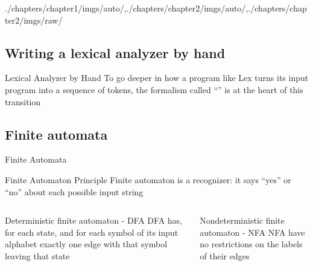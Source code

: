 \begin{graphicspathcontext}{{./chapters/chapter1/imgs/auto/},{./chapters/chapter2/imgs/auto/},{./chapters/chapter2/imgs/raw/}}
\begin{bibunit}[apalike]
\section[Lexical analyzer by hand]{Writing a lexical analyzer by hand}
\sectiontableofcontentslide

\begin{frame}[background=6]{Lexical Analyzer by Hand}
	To go deeper in how a program like Lex turns its input program into a sequence of tokens, the formalism called ``'' is at the heart of this transition
\end{frame}

\subsection{Finite automata}
\subsectiontableofcontentslide

\begin{frame}{Finite Automata}
	\begin{definitionblock}{Finite Automaton Principle}
		Finite automaton is a recognizer: it says ``yes'' or ``no'' about each possible input string
	\end{definitionblock}
	\begin{columns}
		\begin{column}[t]{.5\linewidth}
			\begin{block}{Deterministic finite automaton - DFA}
				DFA has, for each state, and for each symbol of its input alphabet exactly one edge with that symbol leaving that state
			\end{block}
		\end{column}
		\begin{column}[t]{.5\linewidth}
			\begin{block}{Nondeterministic finite automaton - NFA}
				NFA have no restrictions on the labels of their edges
			\end{block}
		\end{column}
	\end{columns}
	\vspace{.5cm}
\end{frame}


\end{bibunit}
\end{graphicspathcontext}
